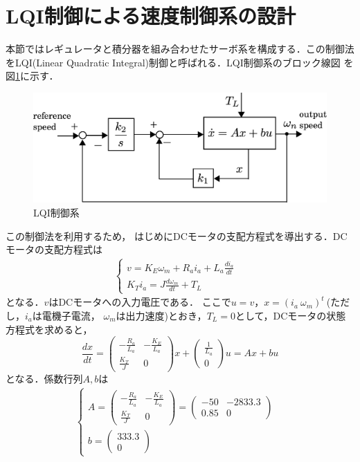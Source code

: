\documentclass[a4paper,12pt]{jarticle}
\begin{document}
\section{LQI制御による速度制御系の設計}
本節ではレギュレータと積分器を組み合わせたサーボ系を構成する．この制御法
をLQI(Linear Quadratic Integral)制御と呼ばれる．LQI制御系のブロック線図
を図\ref{fig:LQI_model}に示す．
%
\begin{figure}[htbp]
 \begin{center}
  \includegraphics[width = 150mm]{fig/LQI_model.eps}
 \end{center}
 \caption{LQI制御系}
 \label{fig:LQI_model}
\end{figure}
%
この制御法を利用するため，
はじめにDCモータの支配方程式を導出する．DCモータの支配方程式は
%
\begin{eqnarray}
 \begin{cases}
  v = K_{E}\omega_m + R_{a}i_{a} + L_{a} \frac{di_a}{dt} & \\
  K_{T}i_a = J \frac{d\omega_m}{dt} + T_{L}
 \end{cases}
\end{eqnarray}
%
となる．$v$はDCモータへの入力電圧である．
ここで$u=v$，$x=(i_a  \ \omega_m)^t \ $(ただし，$i_a$は電機子電流，
$\omega_m$は出力速度)とおき，$T_L=0$として，DCモータの状態方程式を求めると，
\begin{equation}
 \frac{dx}{dt} =
  \begin{pmatrix}
   - \frac{R_a}{L_a} & -\frac{K_E}{L_a} \\
   \frac{K_T}{J} & 0
  \end{pmatrix}
  x +
\begin{pmatrix}
 \frac{1}{L_a} \\
 0
\end{pmatrix}
u = Ax + bu
\end{equation}
となる．係数行列$A,b$は
%
\begin{eqnarray}
 \begin{cases}
A=
  \begin{pmatrix}
   - \frac{R_a}{L_a} & -\frac{K_E}{L_a} \\
   \frac{K_T}{J} & 0
  \end{pmatrix}
  =
  \begin{pmatrix}
   -50  & -2833.3 \\
   0.85 & 0
  \end{pmatrix}
  & \\
  b =
  \begin{pmatrix}
   333.3 \\
   0
  \end{pmatrix}
 \end{cases}
\end{eqnarray}
\end{document}
